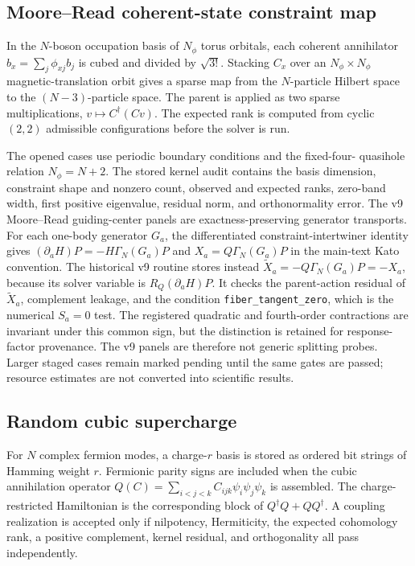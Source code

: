 \subsection{Moore--Read coherent-state constraint map}

In the $N$-boson occupation basis of $N_\phi$ torus orbitals, each coherent
annihilator $b_x=\sum_j\phi_{xj}b_j$ is cubed and divided by $\sqrt{3!}$.
Stacking $C_x$ over an $N_\phi\times N_\phi$ magnetic-translation orbit gives
a sparse map from the $N$-particle Hilbert space to the $(N-3)$-particle
space.  The parent is applied as two sparse multiplications, $v\mapsto
C^\dagger(Cv)$.  The expected rank is computed from cyclic $(2,2)$ admissible
configurations before the solver is run.

The opened cases use periodic boundary conditions and the fixed-four-
quasihole relation $N_\phi=N+2$.  The stored kernel audit contains the basis
dimension, constraint shape and nonzero count, observed and expected ranks,
zero-band width, first positive eigenvalue, residual norm, and orthonormality
error.  The v9 Moore--Read guiding-center panels are exactness-preserving
generator transports.  For each one-body generator $G_a$, the differentiated
constraint-intertwiner identity gives
$(\partial_aH)P=-H\Gamma_N(G_a)P$ and
$X_a=Q\Gamma_N(G_a)P$ in the main-text Kato convention.  The historical v9 routine stores instead
$\widetilde X_a=-Q\Gamma_N(G_a)P=-X_a$, because its solver variable is
$R_Q(\partial_aH)P$.  It checks the parent-action residual of
$\widetilde X_a$, complement leakage, and the condition
\texttt{fiber\_tangent\_zero}, which is the numerical $S_a=0$ test.  The
registered quadratic and fourth-order contractions are invariant under this
common sign, but the distinction is retained for response-factor provenance.
The v9 panels are therefore not generic splitting probes.  Larger staged
cases remain marked pending until the same gates are passed; resource
estimates are not converted into scientific results.

\subsection{Random cubic supercharge}

For $N$ complex fermion modes, a charge-$r$ basis is stored as ordered bit
strings of Hamming weight $r$.  Fermionic parity signs are included when the
cubic annihilation operator
$Q(C)=\sum_{i<j<k}C_{ijk}\psi_i\psi_j\psi_k$ is assembled.
The charge-restricted Hamiltonian is the corresponding block of
$Q^\dagger Q+QQ^\dagger$.  A coupling realization is accepted only if
nilpotency, Hermiticity, the expected cohomology rank, a positive complement,
kernel residual, and orthogonality all pass independently.

